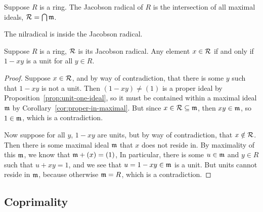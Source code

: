 \begin{definition}
    Suppose \(R\) is a ring.
    The Jacobson radical of \(R\) is the intersection of all maximal ideals,
    \(\mathcal{R} = \bigcap \mathfrak{m}\).
\end{definition}
\begin{remark}
    The nilradical is inside the Jacobson radical.
\end{remark}
\begin{lemma}\label{lem:1-xy-unit}
    Suppose \(R\) is a ring, \(\mathcal{R}\) is its Jacobson radical.
    Any element \(x \in \mathcal{R}\) if and only if \(1 - xy\) is a unit for all \(y \in R\).
\end{lemma}
\begin{proof}
    Suppose \(x \in \mathcal{R}\),
    and by way of contradiction, that there is some \(y\) such that \(1 - xy\) is not a unit.
    Then \((1-xy) \neq (1)\) is a proper ideal by Proposition~\ref{prop:unit-one-ideal},
    so it must be contained within a maximal ideal \(\mathfrak{m}\) by Corollary~\ref{cor:proper-in-maximal}.
    But since \(x \in \mathcal{R} \subseteq \mathfrak{m}\), then \(xy \in \mathfrak{m}\), so \(1 \in \mathfrak{m}\),
    which is a contradiction.

    Now suppose for all \(y\), \(1 - xy\) are units,
    but by way of contradiction, that \(x \notin \mathcal{R}\).
    Then there is some maximal ideal \(\mathfrak{m}\) that \(x\) does not reside in.
    By maximality of this \(\mathfrak{m}\), we know that \(\mathfrak{m} + (x) = (1)\),
    In particular, there is some \(u \in \mathfrak{m}\) and \(y \in R\) such that \(u + xy = 1\),
    and we see that \(u = 1-xy \in \mathfrak{m}\) is a unit.
    But units cannot reside in \(\mathfrak{m}\), because otherwise \(\mathfrak{m} = R\),
    which is a contradiction.
\end{proof}

\subsection*{Coprimality}

